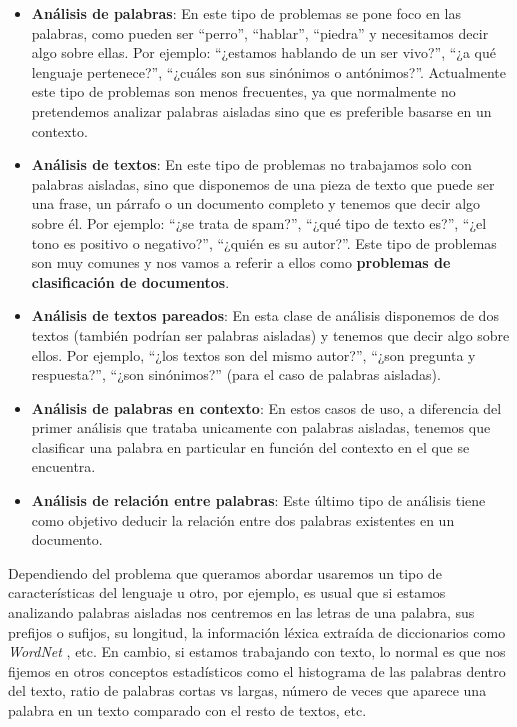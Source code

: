 \begin{itemize}
	\item \textbf{Análisis de palabras}: En este tipo de problemas se pone foco en las palabras, como pueden ser ``perro'', ``hablar'', ``piedra'' y necesitamos decir algo sobre ellas. Por ejemplo: ``¿estamos hablando de un ser vivo?'', ``¿a qué lenguaje pertenece?'', ``¿cuáles son sus sinónimos o antónimos?''. Actualmente este tipo de problemas son menos frecuentes, ya que normalmente no pretendemos analizar palabras aisladas sino que es preferible basarse en un contexto. 
	
	\item \textbf{Análisis de textos}:  En este tipo de problemas no trabajamos solo con palabras aisladas, sino que disponemos de una pieza de texto que puede ser una frase, un párrafo o un documento completo y tenemos que decir algo sobre él. Por ejemplo: ``¿se trata de spam?'', ``¿qué tipo de texto es?'', ``¿el tono es positivo o negativo?'', ``¿quién es su autor?''. Este tipo de problemas son muy comunes y nos vamos a referir a ellos como \textbf{problemas de clasificación de documentos}.   
	
	\item \textbf{Análisis de textos pareados}: En esta clase de análisis disponemos de  dos textos (también podrían ser palabras aisladas) y tenemos que decir algo sobre ellos. Por ejemplo, ``¿los textos son del mismo autor?'', ``¿son pregunta y respuesta?'', ``¿son sinónimos?'' (para el caso de palabras aisladas).
	
	\item \textbf{Análisis de palabras en contexto}: En estos casos de uso, a diferencia del primer análisis que trataba unicamente con  palabras aisladas, tenemos que clasificar una palabra en particular en función del contexto en el que se encuentra. 
	
	\item \textbf{Análisis de relación entre palabras}: Este último tipo de análisis tiene como objetivo deducir la relación entre dos palabras existentes en un documento. 
	
\end{itemize}

Dependiendo del problema que queramos abordar usaremos un tipo de características del lenguaje u otro, por ejemplo, es usual que si estamos analizando palabras aisladas nos centremos en las letras de una palabra, sus prefijos o sufijos, su longitud, la información léxica extraída de diccionarios como \textit{WordNet} \cite{wordnet}, etc. En cambio, si estamos trabajando con texto, lo normal es que nos fijemos en otros conceptos estadísticos como el histograma de las palabras dentro del texto, ratio de palabras cortas vs largas, número de veces que aparece una palabra en un texto comparado con el resto de textos, etc.

